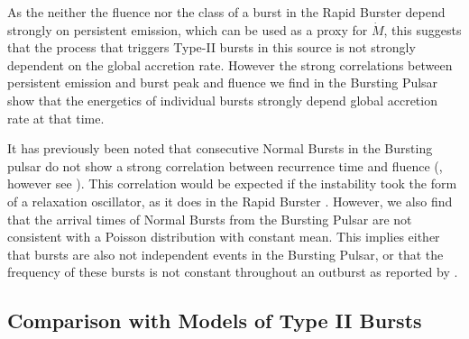 \par As the neither the fluence nor the class of a burst in the Rapid Burster depend strongly on persistent emission, which can be used as a proxy for $\dot{M}$, this suggests that the process that triggers Type-II bursts in this source is not strongly dependent on the global accretion rate.  However the strong correlations between persistent emission and burst peak and fluence we find in the Bursting Pulsar show that the energetics of individual bursts strongly depend global accretion rate at that time.
\par It has previously been noted that consecutive Normal Bursts in the Bursting pulsar do not show a strong correlation between recurrence time and fluence (\citealp{Taam_Evo,Lewin_BP}, however see \citealp{Aptekar_OscRel}).  This correlation would be expected if the instability took the form of a relaxation oscillator, as it does in the Rapid Burster \citep{Lewin_TypeII}.  However, we also find that the arrival times of Normal Bursts from the Bursting Pulsar are not consistent with a Poisson distribution with constant mean.  This implies either that bursts are also not independent events in the Bursting Pulsar, or that the frequency of these bursts is not constant throughout an outburst as reported by \citet{Aptekar_Recur}.

\subsection{Comparison with Models of Type II Bursts}

\label{sec:mod}

